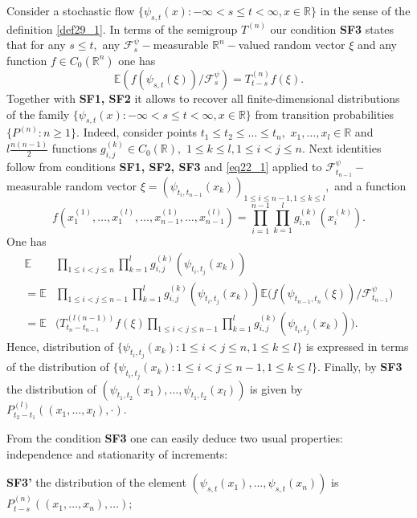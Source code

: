 \documentclass[a4paper,12pt]{article}
\newcommand{\1}{1\!\!\,{\rm I}}
\theoremstyle{plain}
\begin{document}
Consider a stochastic flow $\{\psi_{s,t}(x):-\infty<s\leq t<\infty,x\in \mathbb{R}\}$ in the sense of the definition \ref{def29_1}. In terms of the semigroup $T^{(n)}$ our condition {\bf SF3} states that for any $s\leq t,$ any $\mathcal{F}^\psi_{s}-$measurable $\mathbb{R}^n-$valued random  vector $\xi$ and any function $f\in C_0(\mathbb{R}^n)$ one has
\begin{equation}
\label{eq22_1}
\mathbb{E}(f(\psi_{s,t}(\xi))/\mathcal{F}^\psi_s)=T^{(n)}_{t-s}f(\xi).
\end{equation}
Together with {\bf SF1, SF2} it allows to recover all finite-dimensional distributions of the family $\{\psi_{s,t}(x):-\infty<s\leq t<\infty, x\in \mathbb{R}\}$ from transition probabilities $\{P^{(n)}:n\geq 1\}.$ Indeed, consider  points $t_1\leq t_2\leq \ldots\leq t_n,$ $x_1,\ldots,x_l\in \mathbb{R}$ and $l\frac{n(n-1)}{2}$ functions  $g^{(k)}_{i,j}\in C_0(\mathbb{R}),$ $1\leq k\leq l, 1\leq i<j\leq n.$ Next identities follow from conditions {\bf SF1, SF2, SF3} and \eqref{eq22_1} applied to $\mathcal{F}^\psi_{t_{n-1}}-$measurable random vector $\xi=(\psi_{t_i,t_{n-1}}(x_k))_{1\leq i\leq n-1, 1\leq k\leq l},$ and a function 
$$
f(x^{(1)}_1,\ldots,x^{(l)}_1,\ldots,x^{(1)}_{n-1},\ldots,x^{(l)}_{n-1})=\prod^{n-1}_{i=1}\prod^l_{k=1} g^{(k)}_{i,n}(x^{(k)}_i).
$$ 
One has
$$
\begin{aligned}
\mathbb{E} & \prod_{1\leq i<j\leq n}\prod^l_{k=1} g^{(k)}_{i,j}(\psi_{t_i,t_j}(x_k))\\
=\mathbb{E} & \prod_{1\leq i<j\leq n-1}\prod^l_{k=1} g^{(k)}_{i,j}(\psi_{t_i,t_j}(x_k)) \mathbb{E}\Big(f(\psi_{t_{n-1},t_n}(\xi))/\mathcal{F}^\psi_{t_{n-1}}\Big)\\
=\mathbb{E}& \Big(T^{(l(n-1))}_{t_n-t_{n-1}}f(\xi)\prod_{1\leq i<j\leq n-1}\prod^l_{k=1} g^{(k)}_{i,j}(\psi_{t_i,t_j}(x_k))\Big).
\end{aligned}
$$
Hence, distribution of $\{\psi_{t_i,t_j}(x_k):1\leq i<j\leq n, 1\leq k\leq l\}$ is expressed in terms of the distribution of $\{\psi_{t_i,t_j}(x_k):1\leq i<j\leq n-1, 1\leq k\leq l\}.$ Finally, by {\bf SF3} the distribution of $(\psi_{t_1,t_2}(x_1),\ldots,\psi_{t_1,t_2}(x_l))$ is given by $P^{(l)}_{t_2-t_1}((x_1,\ldots,x_l),\cdot).$


From the condition {\bf SF3} one can easily deduce two usual properties: independence and stationarity of increments:

{\bf SF3'}  the distribution of the element $(\psi_{s,t}(x_1),\ldots,\psi_{s,t}(x_n))$ is $P^{(n)}_{t-s}((x_1,\ldots,x_n),\ldots);$
\end{document}
